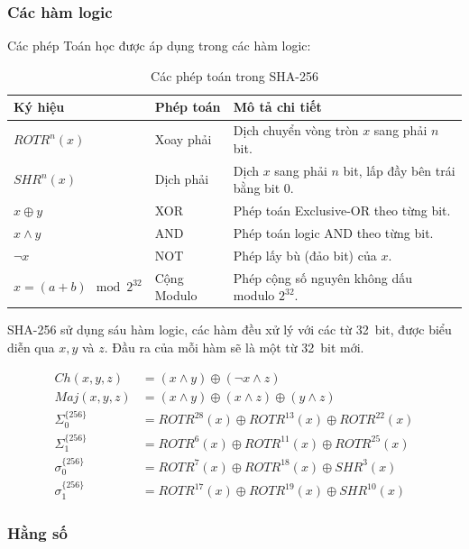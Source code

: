 \subsubsection{Các hàm logic}

Các phép Toán học được áp dụng trong các hàm logic:
\begin{table}[H]
	\centering
	\caption{Các phép toán trong SHA-256}
	\label{tab:sha256-ops}
	\begin{tabular}{|l|l|l|}
		\hline
		\textbf{Ký hiệu} & \textbf{Phép toán} & \textbf{Mô tả chi tiết} \\ \hline
		$ROTR^n(x)$ & Xoay phải & Dịch chuyển vòng tròn $x$ sang phải $n$ bit. \\ \hline
		$SHR^n(x)$ & Dịch phải & Dịch $x$ sang phải $n$ bit, lấp đầy bên trái bằng bit 0. \\ \hline
		$x \oplus y$ & XOR & Phép toán Exclusive-OR theo từng bit. \\ \hline
		$x \wedge y$ & AND & Phép toán logic AND theo từng bit. \\ \hline
		$\neg x$ & NOT & Phép lấy bù (đảo bit) của $x$. \\ \hline
		$x = (a+b) \mod 2^{32} $ & Cộng Modulo & Phép cộng số nguyên không dấu modulo $2^{32}$. \\ \hline
	\end{tabular}
\end{table}	

SHA-256 sử dụng sáu hàm logic, các hàm đều xử lý với các từ 32~bit, được biểu diễn qua $x, y$ và $z$. Đầu ra của mỗi hàm sẽ là một từ 32~bit mới.

\begin{align}
	Ch(x,y,z) &= (x\land y)\oplus(\neg x \land z) \\
	Maj(x,y,z)&= (x\land y)\oplus(x\land z)\oplus(y\land z)\\
	\Sigma_0^{\{256\}} &= ROTR^{28}(x) \oplus ROTR^{13}(x) \oplus ROTR^{22}(x)\\
 	\Sigma_1^{\{256\}} &= ROTR^{6}(x) \oplus ROTR^{11}(x) \oplus ROTR^{25}(x)\\
	\sigma_0^{\{256\}} &= ROTR^{7}(x) \oplus ROTR^{18}(x) \oplus SHR^{3}(x)\\
	\sigma_1^{\{256\}} &= ROTR^{17}(x) \oplus ROTR^{19}(x) \oplus SHR^{10}(x)
\end{align}

\subsubsection{Hằng số}

